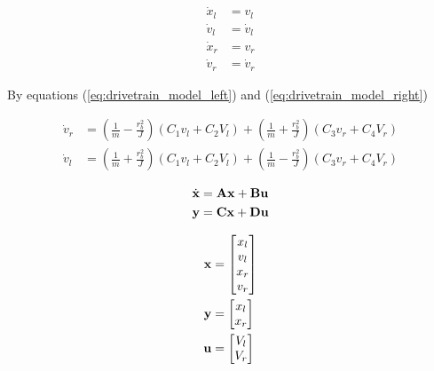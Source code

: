 \begin{align}
  \dot{x}_l &= v_l \label{eq:drivetrain_cont_ss_posl} \\
  \dot{v}_l &= \dot{v}_l \label{eq:drivetrain_cont_ss_vell} \\
  \dot{x}_r &= v_r \label{eq:drivetrain_cont_ss_posr} \\
  \dot{v}_r &= \dot{v}_r \label{eq:drivetrain_cont_ss_velr}
\end{align}

By equations (\ref{eq:drivetrain_model_left}) and
(\ref{eq:drivetrain_model_right})

\begin{align*}
  \dot{v}_r &= \left(\frac{1}{m} - \frac{r_b^2}{J}\right)
    \left(C_1 v_l + C_2 V_l\right) +
    \left(\frac{1}{m} + \frac{r_b^2}{J}\right) \left(C_3 v_r + C_4 V_r\right)
    \\
  \dot{v}_l &= \left(\frac{1}{m} + \frac{r_b^2}{J}\right)
    \left(C_1 v_l + C_2 V_l\right) +
    \left(\frac{1}{m} - \frac{r_b^2}{J}\right) \left(C_3 v_r + C_4 V_r\right)
\end{align*}

\begin{align*}
  \dot{\mathbf{x}} &= \mathbf{A} \mathbf{x} + \mathbf{B} \mathbf{u} \\
  \mathbf{y} &= \mathbf{C} \mathbf{x} + \mathbf{D} \mathbf{u}
\end{align*}

\begin{align*}
  \mathbf{x} &=
  \begin{bmatrix}
    x_l \\
    v_l \\
    x_r \\
    v_r
  \end{bmatrix} \\
  \mathbf{y} &=
  \begin{bmatrix}
    x_l \\
    x_r
  \end{bmatrix} \\
  \mathbf{u} &=
  \begin{bmatrix}
    V_l \\
    V_r
  \end{bmatrix}
\end{align*}


